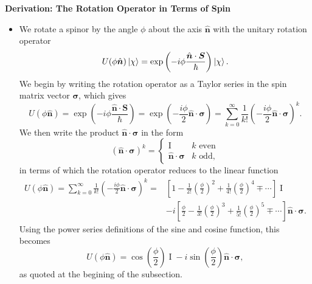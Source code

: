 \documentclass[11pt, a4paper]{article}
\renewcommand{\vec}[1]{\bm{#1}}  %
\newcommand{\uvec}[1]{\hat{\vec{#1}}}  %
\renewcommand{\S}{\vec{S}}  %
\newcommand{\II}{\operatorname{I}}  %
\begin{document}
\textbf{Derivation: The Rotation Operator in Terms of Spin}
\begin{itemize}
	
	\item We rotate a spinor by the angle $ \phi $ about the axis $ \uvec{n} $ with the unitary rotation operator
	\begin{equation*}
		U(\phi \uvec{n})\ket{\chi} = \exp \left(-i\phi \frac{\uvec{n}\cdot \S}{\hbar}\right) \ket{\chi}.
	\end{equation*}
	We begin by writing the rotation operator as a Taylor series in the spin matrix vector $ \vec{\sigma} $, which gives
	\begin{equation*}
		U(\phi \uvec{n}) = \exp \left(-i\phi \frac{\uvec{n}\cdot \S}{\hbar}\right) = \exp \left(-\frac{i\phi}{2}\uvec{n}\cdot \vec{\sigma}\right) = \sum_{k = 0}^{\infty}\frac{1}{k!}\left(-\frac{i\phi}{2}\uvec{n}\cdot \vec{\sigma}\right)^{k}.
	\end{equation*}
	We then write the product $ \uvec{n} \cdot \vec{\sigma} $ in the form
	\begin{equation*}
		(\uvec{n} \cdot \vec{\sigma} )^{k} = 
		\begin{cases}
		\II & k \text{ even}\\
		\uvec{n} \cdot \vec{\sigma} & k \text{ odd},
		\end{cases}
	\end{equation*} 
	in terms of which the rotation operator reduces to the linear function
	\begin{align*}
		U(\phi \uvec{n}) = \sum_{k = 0}^{\infty}\frac{1}{k!}\left(-\frac{i\phi}{2}\uvec{n}\cdot \vec{\sigma}\right)^{k} = &\left[1 - \frac{1}{2!}\left(\frac{\phi}{2}\right)^{2} + \frac{1}{4!}\left(\frac{\phi}{2}\right)^{4} \mp \cdots \right]\II \\
		& - i\left[\frac{\phi}{2} - \frac{1}{3!}\left(\frac{\phi}{2}\right)^{3} + \frac{1}{5!}\left(\frac{\phi}{2}\right)^{5} \mp \cdots \right]\uvec{n} \cdot \vec{\sigma}.
	\end{align*}
	Using the power series definitions of the sine and cosine function, this becomes
	\begin{equation*}
		U(\phi \uvec{n}) = \cos \left(\frac{\phi}{2}\right)\II - i \sin \left(\frac{\phi}{2}\right)\uvec{n} \cdot \vec{\sigma},
	\end{equation*}
    as quoted at the begining of the subsection.
	
\end{itemize}
\end{document}
